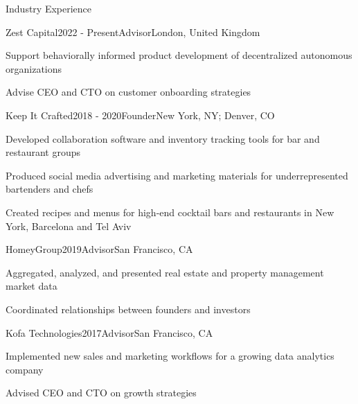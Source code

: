 \documentclass{cv} %
\begin{document}
\begin{cvSection}{Industry Experience}


\begin{cvSubsectionWork}{Zest Capital}{2022 - Present}{Advisor}{London, United Kingdom}
\item Support behaviorally informed product development of decentralized autonomous organizations
\item Advise CEO and CTO on customer onboarding strategies
\end{cvSubsectionWork}


\begin{cvSubsectionWork}{Keep It Crafted}{2018 - 2020}{Founder}{New York, NY; Denver, CO}
\item Developed collaboration software and inventory tracking tools for bar and restaurant groups
\item Produced social media advertising and marketing materials for underrepresented bartenders and chefs
\item Created recipes and menus for high-end cocktail bars and restaurants in New York, Barcelona and Tel Aviv
\end{cvSubsectionWork}


\begin{cvSubsectionWork}{HomeyGroup}{2019}{Advisor}{San Francisco, CA}
\item Aggregated, analyzed, and presented real estate and property management market data
\item Coordinated relationships between founders and investors
\end{cvSubsectionWork}


\begin{cvSubsectionWork}{Kofa Technologies}{2017}{Advisor}{San Francisco, CA}
\item Implemented new sales and marketing workflows for a growing data analytics company
\item Advised CEO and CTO on growth strategies
\end{cvSubsectionWork}


\end{cvSection}
\end{document}
